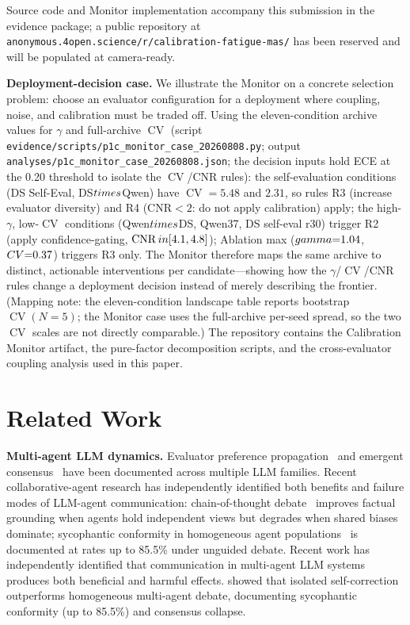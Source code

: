 \documentclass[11pt]{article}
\DeclareMathOperator{\CV}{CV}
\DeclareMathOperator{\CNR}{CNR}
\begin{document}
\noindent Source code and Monitor implementation accompany this submission in the evidence package; a public repository at \texttt{anonymous.4open.science/r/calibration-fatigue-mas/} has been reserved and will be populated at camera-ready.

\noindent\textbf{Deployment-decision case.} We illustrate the Monitor on a concrete selection problem: choose an evaluator configuration for a deployment where coupling, noise, and calibration must be traded off. Using the eleven-condition archive values for $\gamma$ and full-archive $\CV$ (script \texttt{evidence/scripts/p1c\_monitor\_case\_20260808.py}; output \texttt{analyses/p1c\_monitor\_case\_20260808.json}; the decision inputs hold ECE at the 0.20 threshold to isolate the $\CV$/CNR rules): the self-evaluation conditions (DS Self-Eval, DS$\\times$Qwen) have $\CV{=}5.48$ and $2.31$, so rules R3 (increase evaluator diversity) and R4 (CNR$<2$: do not apply calibration) apply; the high-$\gamma$, low-$\CV$ conditions (Qwen$\\times$DS, Qwen37, DS self-eval r30) trigger R2 (apply confidence-gating, $\CNR \\in [4.1, 4.8]$); Ablation max ($\\gamma{=}1.04$, $\\CV{=}0.37$) triggers R3 only. The Monitor therefore maps the same archive to distinct, actionable interventions per candidate---showing how the $\gamma$/$\CV$/CNR rules change a deployment decision instead of merely describing the frontier. (Mapping note: the eleven-condition landscape table reports bootstrap $\CV(N{=}5)$; the Monitor case uses the full-archive per-seed spread, so the two $\CV$ scales are not directly comparable.)
The repository contains the Calibration Monitor artifact, the pure-factor decomposition scripts, and the cross-evaluator coupling analysis used in this paper.


\section{Related Work}




\textbf{Multi-agent LLM dynamics.} Evaluator preference propagation~\cite{mmepc2026} and emergent consensus~\cite{park2023generative} have been documented across multiple LLM families. Recent collaborative-agent research has independently identified both benefits and failure modes of LLM-agent communication: chain-of-thought debate~\cite{du2024improving,li2023camel} improves factual grounding when agents hold independent views but degrades when shared biases dominate; sycophantic conformity in homogeneous agent populations~\cite{bertalanic2026cost} is documented at rates up to 85.5\% under unguided debate. Recent work has independently identified that communication in multi-agent LLM systems produces both beneficial and harmful effects. \citet{bertalanic2026cost} showed that isolated self-correction outperforms homogeneous multi-agent debate, documenting sycophantic conformity (up to 85.5\%) and consensus collapse. 
\end{document}
